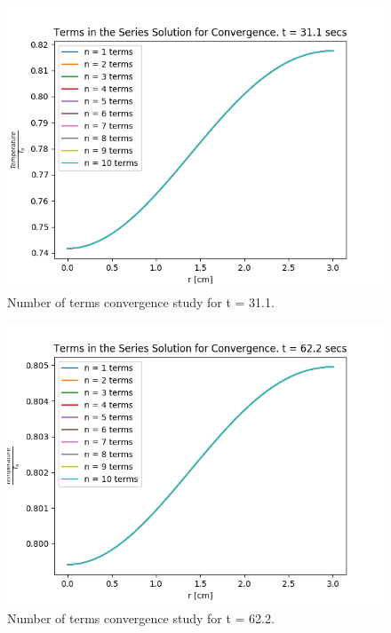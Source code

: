\documentclass[12pt,letterpaper]{article}
\begin{document}
\begin{figure}[htbp!]
  \begin{center}
    \includegraphics[scale=0.7]{terms_311.png}
  \end{center}
  \caption{Number of terms convergence study for t = 31.1.}
  \label{fig:31}
\end{figure}


\begin{figure}[htbp!]
  \begin{center}
    \includegraphics[scale=0.7]{terms_622.png}
  \end{center}
  \caption{Number of terms convergence study for t = 62.2.}
  \label{fig:62}
\end{figure}
\end{document}
